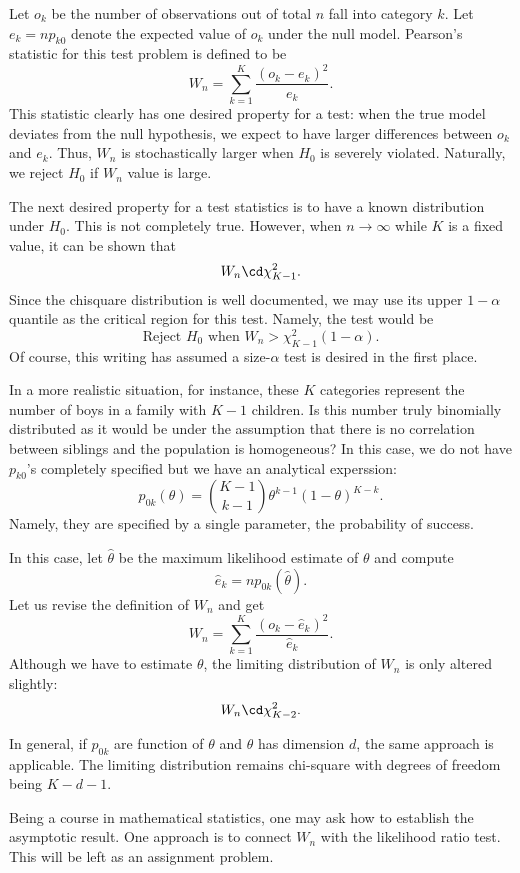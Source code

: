 Let $o_k$ be the number of observations out of total $n$ fall into category $k$.
Let $e_k = n p_{k0}$ denote the expected value of $o_k$ under the null model.
Pearson's statistic for this test problem is defined to be
\[
W_n = \sum_{k=1}^K \frac{ (o_k - e_k)^2}{e_k}.
\]
This statistic clearly has one desired property for a test: when the
true model deviates from the null hypothesis, we expect to have larger
differences between $o_k$ and $e_k$. Thus, $W_n$ is stochastically
larger when $H_0$ is severely violated. Naturally, we reject $H_0$ if
$W_n$ value is large.

The next desired property for a test statistics is to have a known distribution
under $H_0$. This is not completely true. However, when $n \to \infty$ while
$K$ is a fixed value, it can be shown that
\[
W_n \cd \chi_{K-1}^2.
\]
Since the chisquare distribution is well documented, we may use its upper
$1-\alpha$ quantile as the critical region for this test. Namely,
the test would be
\[
\mbox{Reject $H_0$ when } W_n > \chi^2_{K-1} (1 - \alpha).
\]
Of course, this writing has assumed a size-$\alpha$ test is desired
in the first place.


In a more realistic situation, for instance, these $K$ categories represent
the number of boys in a family with $K-1$ children. Is this number
truly binomially distributed as it would be under the assumption
that there is no correlation between siblings and the population is
homogeneous? In this case, we do not have $p_{k0}$'s completely
specified but we have an analytical experssion:
\[
p_{0k}(\theta) = {K-1 \choose k-1} \theta^{k-1} (1-\theta)^{K-k}.
\]
Namely, they are specified by a single parameter, the probability
of success.

In this case, let $\hat \theta$ be the maximum likelihood estimate of $\theta$
and compute
\[
\hat e_k = n p_{0k}(\hat \theta).
\]
Let us revise the definition of $W_n$ and get
\[
W_n = \sum_{k=1}^K \frac{ (o_k - \hat e_k)^2}{\hat e_k}.
\]
Although we have to estimate $\theta$, the limiting distribution of $W_n$
is only altered slightly: 
\[
W_n \cd \chi_{K-2}^2.
\]

In general, if $p_{0k}$ are function of $\theta$ and $\theta$ has dimension $d$,
the same approach is applicable. The limiting distribution remains chi-square
with degrees of freedom being $K-d-1$.

Being a course in mathematical statistics, one may ask how to establish the
asymptotic result. One approach is to connect $W_n$ with the likelihood
ratio test. This will be left as an assignment problem.

